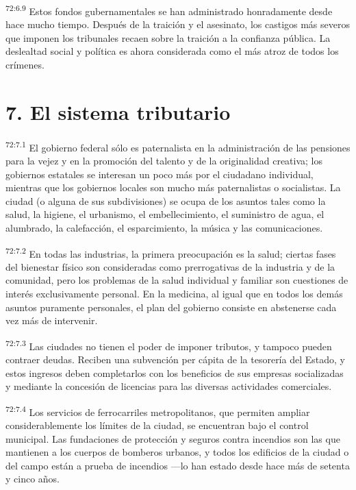 \par
\textsuperscript{72:6.9} Estos fondos gubernamentales se han administrado honradamente desde hace mucho tiempo. Después de la traición y el asesinato, los castigos más severos que imponen los tribunales recaen sobre la traición a la confianza pública. La deslealtad social y política es ahora considerada como el más atroz de todos los crímenes.

\section*{7. El sistema tributario}
\par
\textsuperscript{72:7.1} El gobierno federal sólo es paternalista en la administración de las pensiones para la vejez y en la promoción del talento y de la originalidad creativa; los gobiernos estatales se interesan un poco más por el ciudadano individual, mientras que los gobiernos locales son mucho más paternalistas o socialistas. La ciudad (o alguna de sus subdivisiones) se ocupa de los asuntos tales como la salud, la higiene, el urbanismo, el embellecimiento, el suministro de agua, el alumbrado, la calefacción, el esparcimiento, la música y las comunicaciones.

\par
\textsuperscript{72:7.2} En todas las industrias, la primera preocupación es la salud; ciertas fases del bienestar físico son consideradas como prerrogativas de la industria y de la comunidad, pero los problemas de la salud individual y familiar son cuestiones de interés exclusivamente personal. En la medicina, al igual que en todos los demás asuntos puramente personales, el plan del gobierno consiste en abstenerse cada vez más de intervenir.

\par
\textsuperscript{72:7.3} Las ciudades no tienen el poder de imponer tributos, y tampoco pueden contraer deudas. Reciben una subvención per cápita de la tesorería del Estado, y estos ingresos deben completarlos con los beneficios de sus empresas socializadas y mediante la concesión de licencias para las diversas actividades comerciales.

\par
\textsuperscript{72:7.4} Los servicios de ferrocarriles metropolitanos, que permiten ampliar considerablemente los límites de la ciudad, se encuentran bajo el control municipal. Las fundaciones de protección y seguros contra incendios son las que mantienen a los cuerpos de bomberos urbanos, y todos los edificios de la ciudad o del campo están a prueba de incendios ---lo han estado desde hace más de setenta y cinco años.

